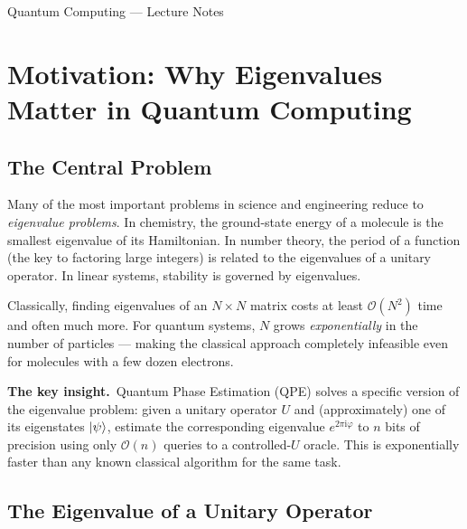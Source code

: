 \documentclass[12pt,a4paper]{article}
\newcommand{\QPE}{\textsc{QPE}}
\newcommand{\ii}{\mathrm{i}}
\newcommand{\bigO}{\mathcal{O}}
\begin{document}
\begin{titlepage}
  \vfill
  {\large\color{midgray} Quantum Computing — Lecture Notes}
\end{titlepage}

\tableofcontents
\newpage

\section{Motivation: Why Eigenvalues Matter in Quantum Computing}
\label{sec:motivation}

\subsection{The Central Problem}

Many of the most important problems in science and engineering reduce to
\emph{eigenvalue problems}.  In chemistry, the ground-state energy of a
molecule is the smallest eigenvalue of its Hamiltonian.  In number theory,
the period of a function (the key to factoring large integers) is related to
the eigenvalues of a unitary operator.  In linear systems, stability is
governed by eigenvalues.

Classically, finding eigenvalues of an $N \times N$ matrix costs at least
$\bigO(N^2)$ time and often much more.  For quantum systems, $N$ grows
\emph{exponentially} in the number of particles — making the classical
approach completely infeasible even for molecules with a few dozen electrons.

\begin{tcolorbox}[insight]
  \textbf{The key insight.}\ Quantum Phase Estimation (\QPE) solves a specific
  version of the eigenvalue problem: given a unitary operator $U$ and
  (approximately) one of its eigenstates $\Ket{\psi}$, estimate the
  corresponding eigenvalue $e^{2\pi \ii \varphi}$ to $n$ bits of precision
  using only $\bigO(n)$ queries to a controlled-$U$ oracle.  This is
  exponentially faster than any known classical algorithm for the same task.
\end{tcolorbox}

\subsection{The Eigenvalue of a Unitary Operator}
\end{document}
